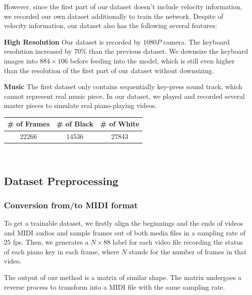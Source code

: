 \documentclass[10pt,twocolumn,letterpaper]{article}
\begin{document}
   However, since the first part of our dataset doesn't include velocity information, we recorded our own dataset additionally to train the network.
   Despite of velocity information, our dataset also has the following several features:

   \textbf{High Resolution} Our dataset is recorded by $1080P$ camera. The keyboard resolution increased by $70\%$ than the previous dataset. We downsize the keyboard images into \(884 \times 106\) before feeding into the model, which is still even higher than the resolution of the first part of our dataset without downsizing.

   \textbf{Music} The first dataset only contains sequentially key-press sound track, which cannot represent real music piece. 
   In our dataset, we played and recorded several master pieces to simulate real piano-playing videos.\\

   \begin{minipage}{0.9\linewidth}
      \centering
   \begin{tabular}{ccc}
      \toprule
      \# of Frames&\# of Black&\# of White\\
      \midrule
      22266&14536&27843\\
      \bottomrule
      \end{tabular}
       \label{tab:ourdataset} 
   \end{minipage}\\

   
\subsection{Dataset Preprocessing}

\subsubsection{Conversion from/to MIDI format}

To get a trainable dataset, we firstly align the beginnings and the ends of videos and MIDI audios and sample frames out of both media files in a sampling rate of $25$ fps. 
Then, we generates a \(N \times 88\) label for each video file recording the status of each piano key in each frame, where \(N\) stands for the number of frames in that video.

The output of our method is a matrix of similar shape. 
The matrix undergoes a reverse process to transform into a MIDI file with the same sampling rate.
\end{document}
